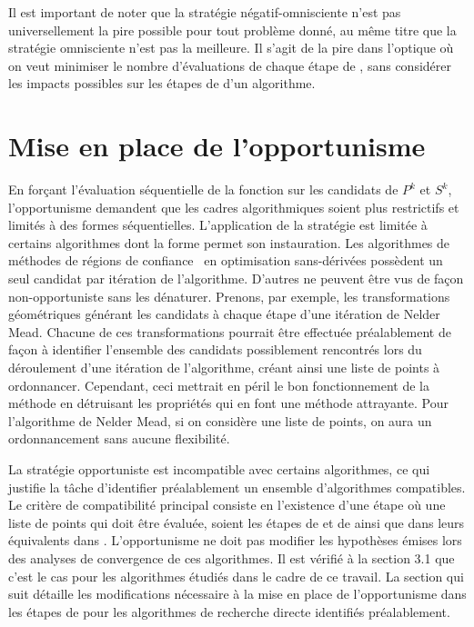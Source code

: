 Il est important de noter que la stratégie négatif-omnisciente n'est pas universellement la pire possible pour tout problème donné, au même titre que la stratégie omnisciente n'est pas la meilleure. Il s'agit de la pire dans l'optique où on veut minimiser le nombre d'évaluations de chaque étape de \POLL, sans considérer les impacts possibles sur les étapes de \SEARCH d'un algorithme.
\section{Mise en place de l'opportunisme}\label{sec:mis}
En forçant l'évaluation séquentielle de la fonction sur les candidats de $P^k$ et $S^k$, l'opportunisme demandent que les cadres algorithmiques soient plus restrictifs et limités à des formes séquentielles. L'application de la stratégie est limitée à certains algorithmes dont la forme permet son instauration. Les algorithmes de méthodes de régions de confiance~\cite{CoScVibook,CoGoTo00a} en optimisation sans-dérivées possèdent un seul candidat par itération de l'algorithme. D'autres ne peuvent être vus de façon non-opportuniste sans les dénaturer. Prenons, par exemple, les transformations géométriques générant les candidats à chaque étape d'une itération de Nelder Mead. Chacune de ces transformations pourrait être effectuée préalablement de façon à identifier l'ensemble des candidats possiblement rencontrés lors du déroulement d'une itération de l'algorithme, créant ainsi une liste de points à ordonnancer. Cependant, ceci mettrait en péril le bon fonctionnement de la méthode en détruisant les propriétés qui en font une méthode attrayante. Pour l'algorithme de Nelder Mead, si on considère une liste de points, on aura un ordonnancement sans aucune flexibilité.

La stratégie opportuniste est incompatible avec certains algorithmes, ce qui justifie la tâche d'identifier préalablement un ensemble d'algorithmes compatibles. Le critère de compatibilité principal consiste en l'existence d'une étape où une liste de points qui doit être évaluée, soient les étapes de \SEARCH et de \POLL ainsi que dans leurs équivalents dans \imfil. L'opportunisme ne doit pas modifier les hypothèses émises lors des analyses de convergence de ces algorithmes. Il est vérifié à la section 3.1 que c'est le cas pour les algorithmes étudiés dans le cadre de ce travail. La section qui suit détaille les modifications nécessaire à la mise en place de l'opportunisme dans les étapes de \POLL pour les algorithmes de recherche directe identifiés préalablement. 
  
